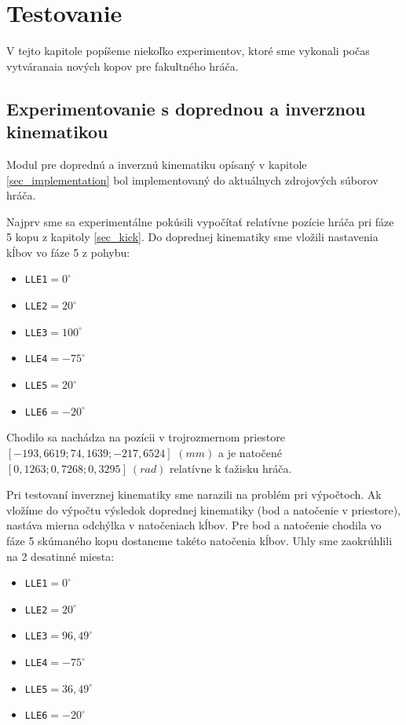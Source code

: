 \section{Testovanie} \label{sec_testing}

V tejto kapitole popíšeme niekoľko experimentov, ktoré sme vykonali počas vytváranaia nových kopov pre fakultného hráča.

\subsection{Experimentovanie s doprednou a inverznou kinematikou} \label{sec_ik_experiments}

Modul pre doprednú a inverznú kinematiku opísaný v kapitole \ref{sec_implementation} bol implementovaný do aktuálnych zdrojových súborov hráča. 

Najprv sme sa experimentálne pokúsili vypočítať relatívne pozície hráča pri fáze 5 kopu z kapitoly \ref{sec_kick}. Do doprednej kinematiky sme vložili nastavenia kĺbov vo fáze 5 z pohybu:
\begin{itemize}
	\item \texttt{LLE1}$=0^{\circ}$
	\item \texttt{LLE2}$=20^{\circ}$
	\item \texttt{LLE3}$=100^{\circ}$
	\item \texttt{LLE4}$=-75^{\circ}$
	\item \texttt{LLE5}$=20^{\circ}$
	\item \texttt{LLE6}$=-20^{\circ}$
\end{itemize}  
Chodilo sa nachádza na pozícii v trojrozmernom priestore $[-193,6619; 74,1639; -217,6524]$ $(mm)$ a je natočené $[0,1263; 0,7268; 0,3295]~(rad)$ relatívne k ťažisku hráča.

Pri testovaní inverznej kinematiky sme narazili na problém pri výpočtoch. Ak vložíme do výpočtu výsledok doprednej kinematiky (bod a natočenie v priestore), nastáva mierna odchýlka v natočeniach kĺbov. Pre bod a natočenie chodila vo fáze 5 skúmaného kopu dostaneme takéto natočenia kĺbov. Uhly sme zaokrúhlili na 2 desatinné miesta:
\begin{itemize}
	\item \texttt{LLE1}$=0^{\circ}$
	\item \texttt{LLE2}$=20^{\circ}$
	\item \texttt{LLE3}$=96,49^{\circ}$
	\item \texttt{LLE4}$=-75^{\circ}$
	\item \texttt{LLE5}$=36,49^{\circ}$
	\item \texttt{LLE6}$=-20^{\circ}$
\end{itemize}  

